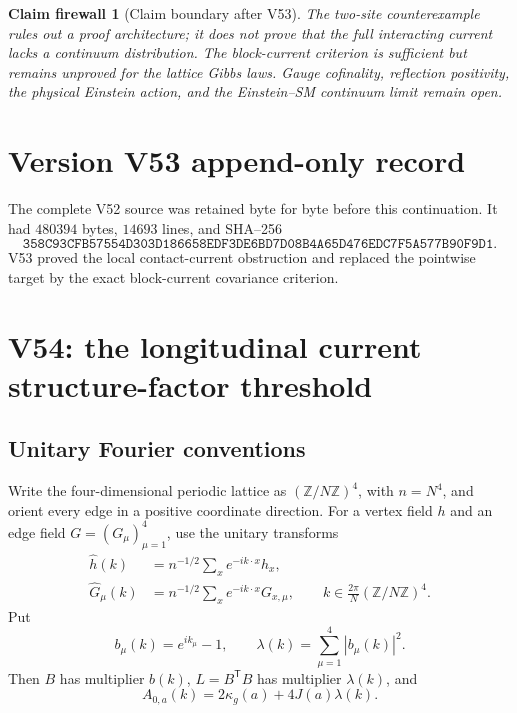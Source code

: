 \documentclass[11pt]{article}
\newtheorem{firewall}[theorem]{Claim firewall}
\theoremstyle{remark}
\begin{document}
\begin{firewall}[Claim boundary after V53]
\label{fire:v17v53}
The two-site counterexample rules out a proof architecture; it does
not prove that the full interacting current lacks a continuum
distribution.  The block-current criterion is sufficient but remains
unproved for the lattice Gibbs laws.  Gauge cofinality, reflection
positivity, the physical Einstein action, and the Einstein--SM
continuum limit remain open.
\end{firewall}

\section*{Version V53 append-only record}
The complete V52 source was retained byte for byte before this
continuation.  It had \(480394\) bytes, \(14693\) lines, and SHA--256
\[
 \texttt{358C93CFB57554D303D186658EDF3DE6BD7D08B4A65D476EDC7F5A577B90F9D1}.
\]
V53 proved the local contact-current obstruction and replaced the
pointwise target by the exact block-current covariance criterion.


\section{V54: the longitudinal current structure-factor threshold}
\label{sec:v17v54}

\subsection{Unitary Fourier conventions}

Write the four-dimensional periodic lattice as
\((\mathbb Z/N\mathbb Z)^4\), with \(n=N^4\), and orient every edge in
a positive coordinate direction.  For a vertex field \(h\) and an
edge field \(G=(G_\mu)_{\mu=1}^4\), use the unitary transforms
\[
\begin{aligned}
 \widehat h(k)&=n^{-1/2}\sum_xe^{-ik\cdot x}h_x,\\
 \widehat G_\mu(k)&=n^{-1/2}\sum_xe^{-ik\cdot x}G_{x,\mu},
 \qquad
 k\in\frac{2\pi}{N}(\mathbb Z/N\mathbb Z)^4.       \tag{54.1}
\end{aligned}
\]
Put
\[
 b_\mu(k)=e^{ik_\mu}-1,\qquad
 \lambda(k)=\sum_{\mu=1}^4|b_\mu(k)|^2.           \tag{54.2}
\]
Then \(B\) has multiplier \(b(k)\), \(L=B^{\mathsf T}B\) has
multiplier \(\lambda(k)\), and
\[
 A_{0,a}(k)=2\kappa_g(a)+4J(a)\lambda(k).          \tag{54.3}
\]
\end{document}

